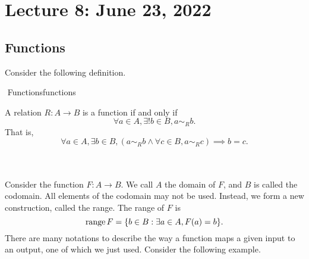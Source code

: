 \section{Lecture 8: June 23, 2022}

    \subsection{Functions}
    
        Consider the following definition.
        \begin{definition}{\Stop\,\,Functions}{functions}
            
            A relation \(R:A\to B\) is a function if and only if
            \begin{equation*}
                \forall a\in A,\exists!b\in B,a\sim_Rb.
            \end{equation*}
            That is,
            \begin{equation*}
                \forall a\in A,\exists b\in B,(a\sim_Rb\wedge\forall c\in B,a\sim_Rc)\implies b=c.
            \end{equation*}
        
        \end{definition}
        \vphantom
        \\
        \\
        Consider the function \(F:A\to B\). We call \(A\) the domain of \(F\), and \(B\) is called the codomain. All elements of the codomain may not be used. Instead, we form a new construction, called the range. The range of \(F\) is
        \begin{equation*}
            \text{range\,} F = \{b\in B:\exists a\in A, F(a)=b\}.
        \end{equation*}
        There are many notations to describe the way a function maps a given input to an output, one of which we just used. Consider the following example.

